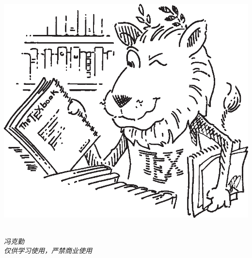 \documentclass[hyperref,oneside]{book}
\begin{document}
    \begin{titlepage}
        \includegraphics[scale=1.4]{Figure/ctanlion.eps}
        \begin{center}
            \Huge{}\\
            \vspace{15pt}
            \Large\itshape{冯克勤}\\
			\Large\itshape{仅供学习使用，严禁商业使用}
        \end{center}
    \end{titlepage}
    \frontmatter
    
    \mainmatter
    \tableofcontents
    
    
\end{document}

